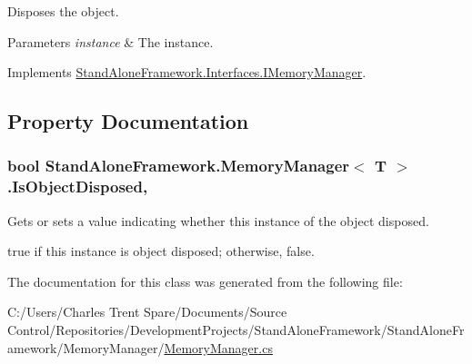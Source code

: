 Disposes the object. 


\begin{DoxyParams}{Parameters}
{\em instance} & The instance.\\
\hline
\end{DoxyParams}


Implements \hyperlink{interface_stand_alone_framework_1_1_interfaces_1_1_i_memory_manager_a277ad312644179fa202782319ee5e801}{Stand\+Alone\+Framework.\+Interfaces.\+I\+Memory\+Manager}.



\subsection{Property Documentation}
\hypertarget{class_stand_alone_framework_1_1_memory_manager_3_01_t_01_4_ad2375b894216a59e50c1942ee82f41c6}{
\subsubsection[{Is\+Object\+Disposed}]{\setlength{\rightskip}{0pt plus 5cm}bool Stand\+Alone\+Framework.\+Memory\+Manager$<$ T $>$.Is\+Object\+Disposed\hspace{0.3cm}{\ttfamily [get]}, {\ttfamily [set]}}}\label{class_stand_alone_framework_1_1_memory_manager_3_01_t_01_4_ad2375b894216a59e50c1942ee82f41c6}


Gets or sets a value indicating whether this instance of the object disposed. 

{\ttfamily true} if this instance is object disposed; otherwise, {\ttfamily false}.

The documentation for this class was generated from the following file\+:\begin{DoxyCompactItemize}
\item 
C\+:/\+Users/\+Charles Trent Spare/\+Documents/\+Source Control/\+Repositories/\+Development\+Projects/\+Stand\+Alone\+Framework/\+Stand\+Alone\+Framework/\+Memory\+Manager/\hyperlink{_memory_manager_8cs}{Memory\+Manager.\+cs}\end{DoxyCompactItemize}
